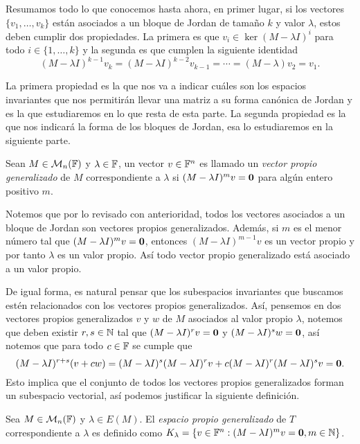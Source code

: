Resumamos todo lo que conocemos hasta ahora, en primer lugar, si los vectores $\{v_1,\ldots,v_k\}$ están asociados a un bloque de Jordan de tamaño $k$ y valor $\lambda$, estos deben cumplir dos propiedades. La primera es que $v_i \in \ker(M-\lambda I)^i$ para todo $i \in \{1,\ldots,k\}$ y la segunda es que cumplen la siguiente identidad
\[
  (M-\lambda I)^{k-1}v_k = (M-\lambda I)^{k-2}v_{k-1} = \cdots = (M-\lambda)v_2 = v_1.
\]

La primera propiedad es la que nos va a indicar cuáles son los espacios invariantes que nos permitirán llevar una matriz a su forma canónica de Jordan y es la que estudiaremos en lo que resta de esta parte. La segunda propiedad es la que nos indicará la forma de los bloques de Jordan, esa lo estudiaremos en la siguiente parte.

\begin{defi}
  Sean $M \in \mathcal{M}_n(\mathbb{F})$ y $\lambda \in \mathbb{F}$, un vector $v \in \mathbb{F}^n$ es llamado un \emph{vector propio generalizado} de $M$ correspondiente a $\lambda$ si $(M-\lambda I)^m v = \mathbf{0}$ para algún entero positivo $m$.
\end{defi}

Notemos que por lo revisado con anterioridad, todos los vectores asociados a un bloque de Jordan son vectores propios generalizados. Además, si $m$ es el menor número tal que $(M-\lambda I)^mv = \mathbf{0}$, entonces $(M-\lambda I)^{m-1}v$ es un vector propio y por tanto $\lambda$ es un valor propio. Así todo vector propio generalizado está asociado a un valor propio.

De igual forma, es natural pensar que los subespacios invariantes que buscamos estén relacionados con los vectores propios generalizados. Así, pensemos en dos vectores propios generalizados $v$ y $w$ de $M$ asociados al valor propio $\lambda$, notemos que deben existir $r, s \in \mathbb{N}$ tal que $(M-\lambda I)^r v = \mathbf{0}$ y $(M-\lambda I)^s w = \mathbf{0}$, así notemos que para todo $c\in\mathbb{F}$ se cumple que
\[
  (M-\lambda I)^{r+s}(v+cw) = (M-\lambda I)^s(M-\lambda I)^r v + c (M-\lambda I)^r (M-\lambda I)^sv = \mathbf{0}.
\]
Esto implica que el conjunto de todos los vectores propios generalizados forman un subespacio vectorial, así podemos justificar la siguiente definición.

\begin{defi}
  Sea $M \in \mathcal{M}_n(\mathbb{F})$ y $\lambda \in E(M)$. El \emph{espacio propio generalizado} de  $T$ correspondiente a $\lambda$ es definido como $K_\lambda = \{v \in \mathbb{F}^n : (M-\lambda I)^m v = \mathbf{0}, m \in \mathbb{N}\}$.
\end{defi}

